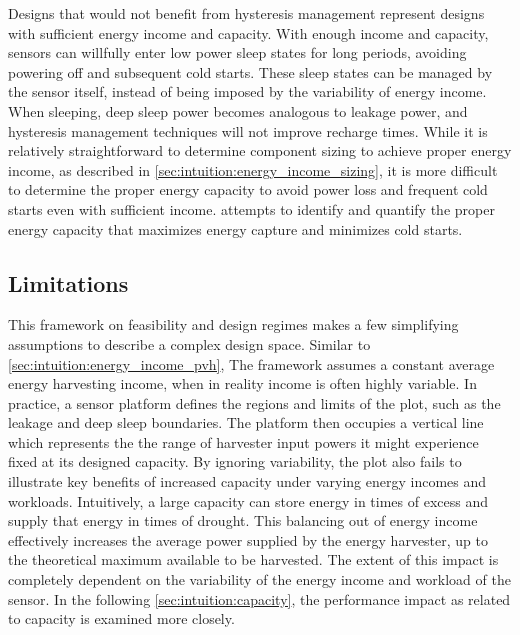 Designs that would not benefit from hysteresis management represent designs with sufficient energy income and capacity.
With enough income and capacity, sensors can willfully enter low power sleep states for long periods, avoiding powering off and subsequent cold starts.
These sleep states can be managed by the sensor itself, instead of being imposed by the variability of energy income.
When sleeping, deep sleep power becomes analogous to leakage power, and hysteresis management techniques will not improve recharge times.
While it is relatively straightforward to determine component sizing to achieve proper energy income, as described in \cref{sec:intuition:energy_income_sizing}, it is more difficult to determine the proper energy capacity to avoid power loss and frequent cold starts even with sufficient income.  attempts to identify and quantify the proper energy capacity that maximizes energy capture and minimizes cold starts.




\subsection{Limitations}
\label{sec:intuition:framework_limitations}
This framework on feasibility and design regimes makes a few simplifying assumptions to describe a complex design space.
Similar to \cref{sec:intuition:energy_income_pvh}, The framework assumes a constant average energy
harvesting income, when in reality income is often highly variable.
In practice, a sensor
platform defines the regions and limits of the plot, such as the leakage and deep sleep boundaries.
The platform then occupies a
vertical line which represents the
the range of harvester input powers it might experience fixed at its designed capacity.
By ignoring variability, the plot also fails to illustrate key benefits
of increased capacity under varying energy incomes and workloads.
Intuitively,
a large capacity can store energy in times of excess and supply
that energy in times of drought. This balancing out of energy income
effectively increases the average power supplied by the energy harvester, up to the theoretical maximum available to be harvested.
The extent of this impact is completely dependent on the variability
of the energy income and workload of the sensor.
In the following \cref{sec:intuition:capacity}, the performance impact as related to capacity is examined more closely.

